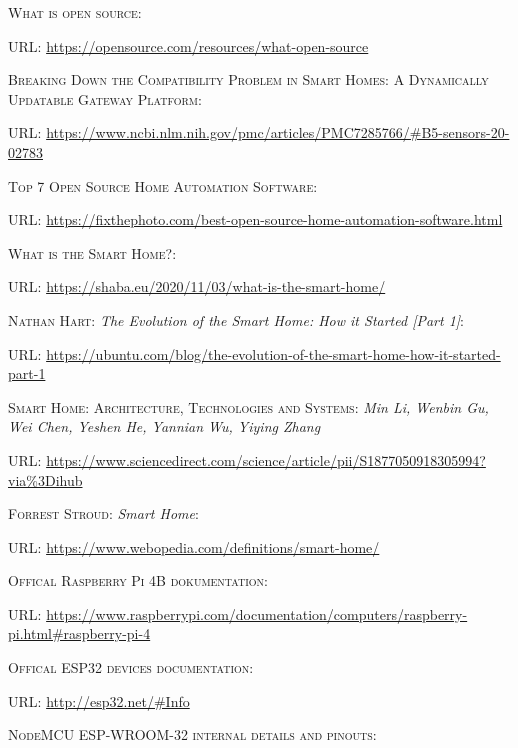 \documentclass[
]{thesis-ekf}
\theoremstyle{definition}
\theoremstyle{remark}
\begin{document}
	\begin{thebibliography}{20}
		\textsc{What is open source}:
		
		\textsc{URL:} \url{https://opensource.com/resources/what-open-source}
		
		\textsc{Breaking Down the Compatibility Problem in Smart Homes: A Dynamically Updatable Gateway Platform}:
		
		\textsc{URL:} \url{https://www.ncbi.nlm.nih.gov/pmc/articles/PMC7285766/#B5-sensors-20-02783}
		
		\textsc{Top 7 Open Source Home Automation Software}:
		
		\textsc{URL:} \url{https://fixthephoto.com/best-open-source-home-automation-software.html}
		
		\textsc{What is the Smart Home?}:
		
		\textsc{URL:} \url{https://shaba.eu/2020/11/03/what-is-the-smart-home/}
		
		\textsc{Nathan Hart}: \emph{The Evolution of the Smart Home: How it Started [Part 1]}:
		
		\textsc{URL}: \url{https://ubuntu.com/blog/the-evolution-of-the-smart-home-how-it-started-part-1}
		
		\textsc{Smart Home: Architecture, Technologies and Systems}: \emph{Min Li, Wenbin Gu, Wei Chen, Yeshen He, Yannian Wu, Yiying Zhang}
		
		\textsc{URL:} \url{https://www.sciencedirect.com/science/article/pii/S1877050918305994?via%3Dihub}
		
		\textsc{Forrest Stroud}: \emph{Smart Home}:
		
		\textsc{URL:} \url{https://www.webopedia.com/definitions/smart-home/}
		
		\textsc{Offical Raspberry Pi 4B dokumentation}:
		
		\textsc{URL:} \url{https://www.raspberrypi.com/documentation/computers/raspberry-pi.html#raspberry-pi-4}
		
		\textsc{Offical ESP32 devices documentation}:
		
		\textsc{URL:} \url{http://esp32.net/#Info}
		
		\textsc{NodeMCU ESP-WROOM-32 internal details and pinouts}:
		

\end{thebibliography}
\end{document}
